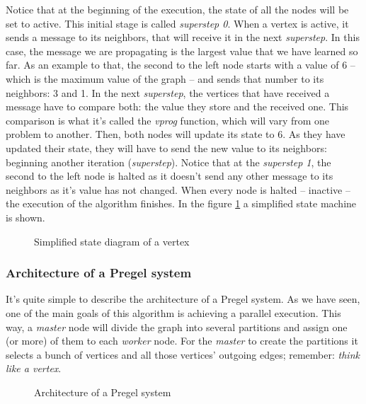Notice that at the beginning of the execution, the state of all the nodes will be set to active. This initial stage is called \textit{superstep 0}. When a vertex is active, it sends a message to its neighbors, that will receive it in the next \textit{superstep}. In this case, the message we are propagating is the largest value that we have learned so far. As an example to that, the second to the left node starts with a value of 6 -- which is the maximum value of the graph -- and sends that number to its neighbors: 3 and 1. In the next \textit{superstep}, the vertices that have received a message have to compare both: the value they store and the received one. This comparison is what it's called the \textit{vprog} function, which will vary from one problem to another. Then, both nodes will update its state to 6. As they have updated their state, they will have to send the new value to its neighbors: beginning another iteration (\textit{superstep}). Notice that at the \textit{superstep 1}, the second to the left node is halted as it doesn't send any other message to its neighbors as it's value has not changed. When every node is halted -- inactive -- the execution of the algorithm finishes. In the figure \ref{fig:state} a simplified state machine is shown.

\begin{figure}[h]
    \centering
    
    \caption[Simplified state diagram of a vertex]{Simplified state diagram of a vertex~\cite{10.1145/1807167.1807184}}
    \label{fig:state}
\end{figure}

\subsubsection{Architecture of a Pregel system}
\label{section:architecture:pregel}

It's quite simple to describe the architecture of a Pregel system. As we have seen, one of the main goals of this algorithm is achieving a parallel execution. This way, a \textit{master} node will divide the graph into several partitions and assign one (or more) of them to each \textit{worker} node. For the \textit{master} to create the partitions it selects a bunch of vertices and all those vertices' outgoing edges; remember: \textit{think like a vertex}.

\begin{figure}[h]
    \centering
    
    \caption[Architecture of a Pregel system]{Architecture of a Pregel system~\cite{10.1145/3349265}}
    \label{fig:architecture:pregel}
\end{figure}
